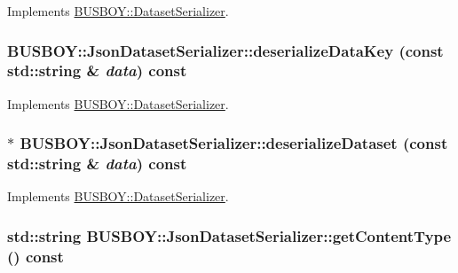 Implements \hyperlink{classBUSBOY_1_1DatasetSerializer_a3937ed2b549641822c5b967f897525f0}{BUSBOY::DatasetSerializer}.\hypertarget{classBUSBOY_1_1JsonDatasetSerializer_ac4cadb7d348a3fe201a360de2100b02f}{
\subsubsection[{deserializeDataKey}]{ BUSBOY::JsonDatasetSerializer::deserializeDataKey (const std::string \& {\em data}) const}}
\label{classBUSBOY_1_1JsonDatasetSerializer_ac4cadb7d348a3fe201a360de2100b02f}


Implements \hyperlink{classBUSBOY_1_1DatasetSerializer_a2bae57eabc95977f4c9679bb88289fa8}{BUSBOY::DatasetSerializer}.\hypertarget{classBUSBOY_1_1JsonDatasetSerializer_a2e3d76a4ee7e7e3afcfef509b3e8a289}{
\subsubsection[{deserializeDataset}]{ $\ast$ BUSBOY::JsonDatasetSerializer::deserializeDataset (const std::string \& {\em data}) const}}
\label{classBUSBOY_1_1JsonDatasetSerializer_a2e3d76a4ee7e7e3afcfef509b3e8a289}


Implements \hyperlink{classBUSBOY_1_1DatasetSerializer_a1afb118e410e71ebd7416aefd2aa7121}{BUSBOY::DatasetSerializer}.\hypertarget{classBUSBOY_1_1JsonDatasetSerializer_a80f71734e5e99b3230cfdca597f6d636}{
\subsubsection[{getContentType}]{\setlength{\rightskip}{0pt plus 5cm}std::string BUSBOY::JsonDatasetSerializer::getContentType () const}}
\label{classBUSBOY_1_1JsonDatasetSerializer_a80f71734e5e99b3230cfdca597f6d636}



